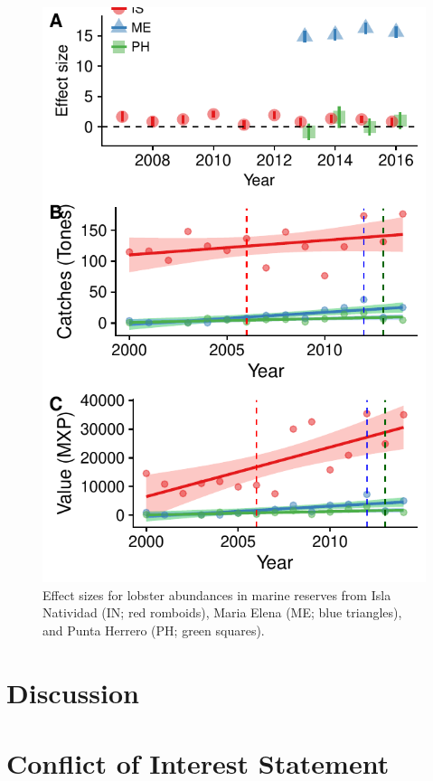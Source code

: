 \documentclass{frontiersSCNS}
\begin{document}
\begin{figure}
\centering
\includegraphics{Villasenor-Derbez_files/figure-latex/unnamed-chunk-4-1.pdf}
\caption{\label{fig:unnamed-chunk-4}\label{fig:lobsters}Effect sizes for
lobster abundances in marine reserves from Isla Natividad (IN; red
romboids), Maria Elena (ME; blue triangles), and Punta Herrero (PH;
green squares).}
\end{figure}

\section{Discussion}\label{discussion}

\section*{Conflict of Interest Statement}
\end{document}
